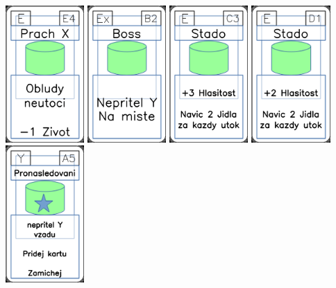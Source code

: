 \documentclass[a4paper]{article}
\begin{document}
	\includegraphics[width=3.0cm]{img-4_53}
	\includegraphics[width=3.0cm]{img-4_6}
	\includegraphics[width=3.0cm]{img-4_42}
	\includegraphics[width=3.0cm]{img-4_45}
	\includegraphics[width=3.0cm]{img-5_34}
\end{document}
